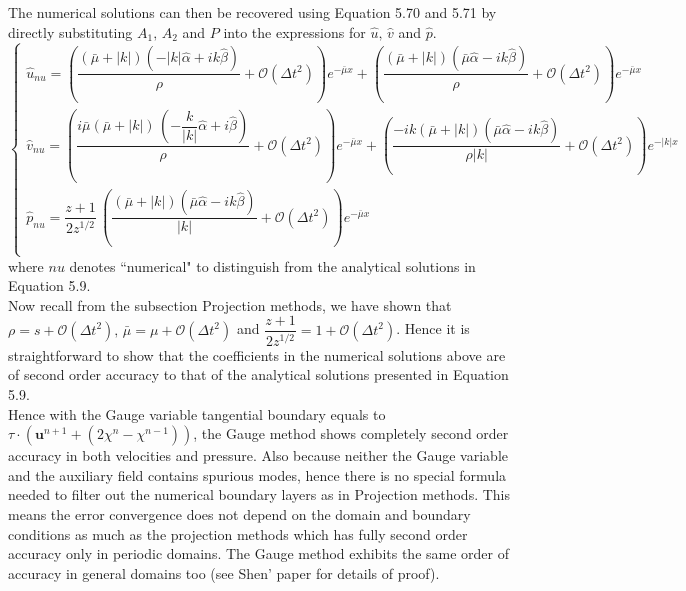 The numerical solutions can then be recovered using Equation 5.70 and 5.71 by directly substituting $A_1,\,A_2$ and $P$ into the expressions for $\hat{u}, \,\hat{v}$ and $\hat{p}$.
\begin{equation}
\begin{cases}
\hat{u}_{nu} = \left(\dfrac{(\bar{\mu}+|k|)(-|k|\hat{\alpha}+ik\hat{\beta})}{\rho} + \mathcal{O}(\Delta t^2) \right)e^{-\bar{\mu}x} + \left(\dfrac{(\bar{\mu} + |k|)(\bar{\mu}\hat{\alpha} - ik\hat{\beta})}{\rho} + \mathcal{O}(\Delta t^2) \right)e^{-\bar{\mu}x}\\
\hat{v}_{nu} =  \left(\dfrac{i\bar{\mu}(\bar{\mu} + |k|)\,\left(- \dfrac{k}{|k|}\hat{\alpha}+i\hat{\beta}\right)}{\rho} +\mathcal{O}(\Delta t^2)\right) e^{-\bar{\mu} x} +  \left(\dfrac{-ik(\bar{\mu} + |k|)(\bar{\mu}\hat{\alpha} - ik\hat{\beta})}{\rho|k|} +\mathcal{O}(\Delta t^2)\right) e^{- |k| x} \\
\hat{p}_{nu} = \dfrac{z+1}{2z^{1/2}}\,\left(\dfrac{(\bar{\mu} + |k|)(\bar{\mu}\hat{\alpha} - ik\hat{\beta})}{|k|} + \mathcal{O}(\Delta t^2) \right)e^{-\bar{\mu}x}\\
\end{cases}
\end{equation}
where $nu$ denotes ``numerical" to distinguish from the analytical solutions in Equation 5.9.\\

Now recall from the subsection Projection methods, we have shown that $\rho = s + \mathcal{O} (\Delta t^2), \, \bar{\mu} = \mu + \mathcal{O} (\Delta t^2)$ and $\dfrac{z+1}{2z^{1/2}} = 1 + \mathcal{O} (\Delta t^2)$. Hence it is straightforward to show that the coefficients in the numerical solutions above are of second order accuracy to that of the analytical solutions presented in Equation 5.9.\\

Hence with the Gauge variable tangential boundary equals to $\textbf{$\tau$}\cdot\left(\textbf{u}^{n+1} + (2\chi^n - \chi^{n-1})\right)$, the Gauge method shows completely second order accuracy in both velocities and pressure. Also because neither the Gauge variable and the auxiliary field contains spurious modes, hence there is no special formula needed to filter out the numerical boundary layers as in Projection methods. This means the error convergence does not depend on the domain and boundary conditions as much as the projection methods which has fully second order accuracy only in periodic domains. The Gauge method exhibits the same order of accuracy in general domains too (see Shen' paper \cite{pyo2005normal,guermond2006overview} for details of proof).